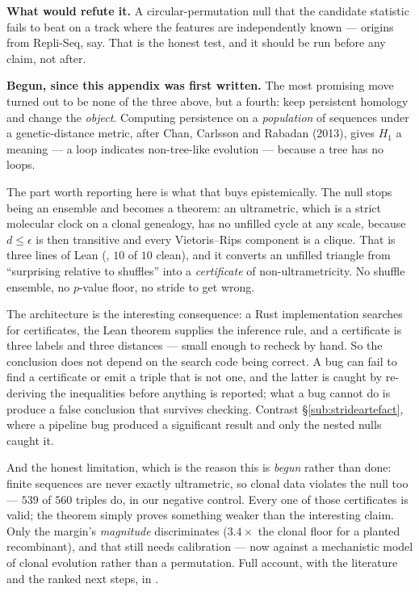 \textbf{What would refute it.} A circular-permutation null that the candidate
statistic fails to beat on a track where the features are independently known
--- origins from Repli-Seq, say. That is the honest test, and it should be run
before any claim, not after.

\textbf{Begun, since this appendix was first written.} The most promising move
turned out to be none of the three above, but a fourth: keep persistent
homology and change the \emph{object}. Computing persistence on a
\emph{population} of sequences under a genetic-distance metric, after Chan,
Carlsson and Rabadan (2013), gives $H_1$ a meaning --- a loop indicates
non-tree-like evolution --- because a tree has no loops.

The part worth reporting here is what that buys epistemically. The null stops
being an ensemble and becomes a theorem: an ultrametric, which is a strict
molecular clock on a clonal genealogy, has no unfilled cycle at any scale,
because $d \le \epsilon$ is then transitive and every Vietoris--Rips component
is a clique. That is three lines of Lean
(, $10$ of $10$ clean), and it
converts an unfilled triangle from ``surprising relative to shuffles'' into a
\emph{certificate} of non-ultrametricity. No shuffle ensemble, no $p$-value
floor, no stride to get wrong.

The architecture is the interesting consequence: a Rust implementation searches
for certificates, the Lean theorem supplies the inference rule, and a
certificate is three labels and three distances --- small enough to recheck by
hand. So the conclusion does not depend on the search code being correct. A bug
can fail to find a certificate or emit a triple that is not one, and the latter
is caught by re-deriving the inequalities before anything is reported; what a
bug cannot do is produce a false conclusion that survives checking. Contrast
\S\ref{sub:strideartefact}, where a pipeline bug produced a significant result
and only the nested nulls caught it.

And the honest limitation, which is the reason this is \emph{begun} rather than
done: finite sequences are never exactly ultrametric, so clonal data violates
the null too --- $539$ of $560$ triples do, in our negative control. Every one
of those certificates is valid; the theorem simply proves something weaker than
the interesting claim. Only the margin's \emph{magnitude} discriminates
($3.4\times$ the clonal floor for a planted recombinant), and that still needs
calibration --- now against a mechanistic model of clonal evolution rather than
a permutation. Full account, with the literature and the ranked next steps, in
.

